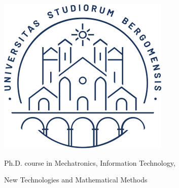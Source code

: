 \documentclass[
12pt, %
oneside, %
english, %
singlespacing, %
headsepline, %
consistentlayout, %
]{MastersDoctoralThesis} %
\author{Marco \textsc{Radavelli}} %
\newcommand{\citlab}{\textsc{CitLab}\xspace}
\theoremstyle{plain}
\theoremstyle{definition}
\theoremstyle{remark}
\theoremstyle{remark}
\theoremstyle{plain}
\theoremstyle{plain}
\theoremstyle{remark}
\begin{document}
	
\nobibliography*

\frontmatter %

\pagestyle{plain} %


\frontmatter
\begin{titlepage}
  \begin{center}
    \includegraphics[scale=0.5]{images/sigillo.png}
    
    \vspace{1cm}
    
    
    \vspace{1cm}
    
	{\huge \bfseries \ttitle\par}\vspace{0.4cm} %
	
    \vspace{1.5cm}
    
    {\huge \authorname}
    
    \vspace{.2cm}
    
    {\large Ph.D. course in Mechatronics, Information Technology,

	New Technologies and Mathematical Methods}


\end{center}
\end{titlepage}
\end{document}
